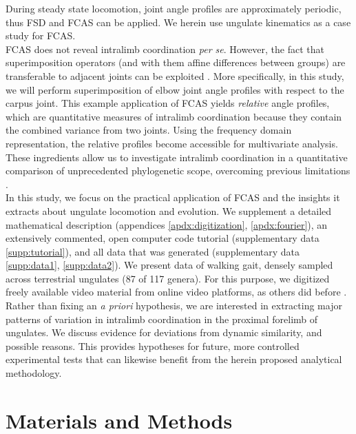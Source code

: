 During steady state locomotion, joint angle profiles are approximately periodic, thus FSD and FCAS can be applied.
We herein use ungulate kinematics as a case study for FCAS.
\\FCAS does not reveal intralimb coordination \textit{per se}.
However, the fact that superimposition operators (and with them affine differences between groups) are transferable to adjacent joints can be exploited \cite[analogous to][]{Mielke2018b}.
More specifically, in this study, we will perform superimposition of elbow joint angle profiles with respect to the carpus joint.
This example application of FCAS yields \textit{relative} angle profiles, which are quantitative measures of intralimb coordination because they contain the combined variance from two joints.
Using the frequency domain representation, the relative profiles become accessible for multivariate analysis.
These ingredients allow us to investigate intralimb coordination in a quantitative comparison of unprecedented phylogenetic scope, overcoming previous limitations \citep{Gatesy2011}.
\\In this study, we focus on the practical application of FCAS and the insights it extracts about ungulate locomotion and evolution.
We supplement a detailed mathematical description (appendices \ref*{apdx:digitization}, \ref*{apdx:fourier}), an extensively commented, open computer code tutorial (supplementary data \ref*{supp:tutorial}), and all data that was generated (supplementary data \ref*{supp:data1}, \ref*{supp:data2}).
We present data of walking gait, densely sampled across terrestrial ungulates (87 of 117 genera).
For this purpose, we digitized freely available video material from online video platforms, as others did before \citep{Biancardi2012,Lees2016}.
Rather than fixing an \textit{a priori} hypothesis, we are interested in extracting major patterns of variation in intralimb coordination in the proximal forelimb of ungulates.
We discuss evidence for deviations from dynamic similarity, and possible reasons.
This provides hypotheses for future, more controlled experimental tests that can likewise benefit from the herein proposed analytical methodology.



\FloatBarrier\pagebreak
\section{Materials and Methods}
